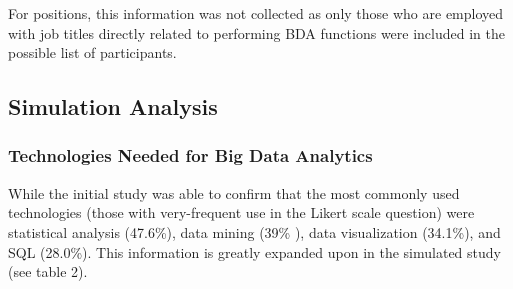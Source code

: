 For positions, this information was not collected as only those who are employed with job titles directly related to performing BDA functions were included in the possible list of participants.

\subsection{Simulation Analysis}

\subsubsection{Technologies Needed for Big Data Analytics}

While the initial study was able to confirm that the most commonly used technologies (those with very-frequent use in the Likert scale question) were statistical analysis (47.6\%), data mining (39\%
), data visualization (34.1\%), and SQL (28.0\%). This information is greatly expanded upon in the simulated study (see table 2).

